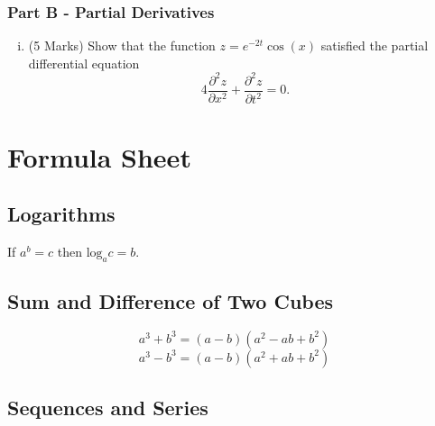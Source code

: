 \documentclass[a4paper,12pt]{article}
\begin{document}
\bigskip
\subsubsection*{Part B - Partial Derivatives}
\begin{enumerate}[(i)]

 \item (5 Marks)
 Show that the function $z=e^{-2t}\cos(x)$ satisfied the partial differential equation
 \[ 4\frac{\partial^2 z}{\partial x^2} + \frac{\partial^2 z}{\partial t^2} = 0. \]
\end{enumerate}
%
%	
%
%
%

\newpage
	
	\section*{Formula Sheet}
	
	\subsection*{Logarithms}
	If $a^b = c$ then $\mbox{log}_a c = b$.
	\subsection*{Sum and Difference of Two Cubes}
	\[ a^3 + b^3 = (a-b)(a^2 - ab + b^2)\]
	\[ a^3 - b^3 = (a-b)(a^2 + ab + b^2)\]
	
	
	\subsection*{Sequences and Series}
	
\end{document}
